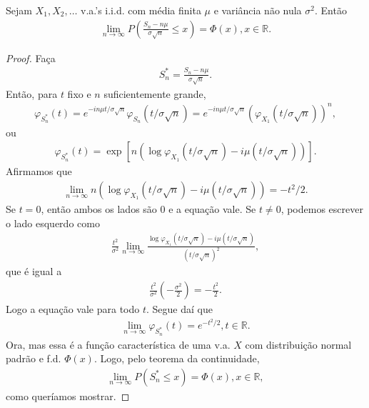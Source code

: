 \documentclass[../Notas.tex]{subfiles}
\begin{document}
\begin{theorem}
Sejam $X_1, X_2, \dots$ v.a.'s i.i.d. com média finita $\mu$ e variância não nula $\sigma^2$. Então
\begin{align*}
    \lim_{n\to\infty} P\left( \frac{S_n - n\mu}{\sigma\sqrt{n}} \leq x\right) = \Phi(x), x\in\mathbb{R}.
\end{align*}
\end{theorem}
\begin{proof}
Faça
\begin{align*}
    S_n^* = \frac{S_n - n\mu}{\sigma\sqrt{n}}.
\end{align*}
Então, para $t$ fixo e $n$ suficientemente grande,
\begin{align*}
    \varphi_{S_n^*}(t) = e^{-in\mu t/\sigma\sqrt{n}}\varphi_{S_n}(t/\sigma\sqrt{n}) = e^{-in\mu t/\sigma\sqrt{n}}(\varphi_{X_1}(t/\sigma\sqrt{n}))^n,
\end{align*}
ou
\begin{align*}
    \varphi_{S_n^*}(t) = \exp[ n( \log\varphi_{X_1}(t/\sigma\sqrt{n}) - i\mu(t/\sigma\sqrt{n}) ) ].
\end{align*}
Afirmamos que
\begin{align*}
    \lim_{n\to\infty} n( \log\varphi_{X_1}(t/\sigma\sqrt{n}) - i\mu(t/\sigma\sqrt{n}) ) = -t^2/2.
\end{align*}
Se $t=0$, então ambos os lados são 0 e a equação vale. Se $t\neq 0$, podemos escrever o lado esquerdo como
\begin{align*}
    \frac{t^2}{\sigma^2}\lim_{n\to\infty} \frac{ \log\varphi_{X_1}(t/\sigma\sqrt{n}) - i\mu(t/\sigma\sqrt{n}) }{(t/\sigma\sqrt{n})^2},
\end{align*}
que é igual a
\begin{align*}
    \frac{t^2}{\sigma^2}\left( -\frac{\sigma^2}{2} \right) = -\frac{t^2}{2}.
\end{align*}
Logo a equação vale para todo $t$. Segue daí que
\begin{align*}
    \lim_{n\to\infty} \varphi_{S_n^*}(t) = e^{-t^2/2}, t\in\mathbb{R}.
\end{align*}
Ora, mas essa é a função característica de uma v.a. $X$ com distribuição normal padrão e f.d. $\Phi(x)$. Logo, pelo teorema da continuidade,
\begin{align*}
    \lim_{n\to\infty} P(S_n^* \leq x) = \Phi(x), x\in\mathbb{R},
\end{align*}
como queríamos mostrar.
\end{proof}
\end{document}
